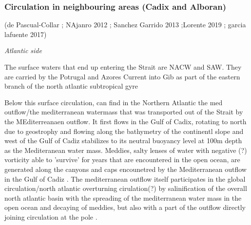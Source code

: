 






\subsubsection{Circulation in neighbouring areas (Cadix and Alboran)}

(de Pascual-Collar ; NAjanro 2012 ; Sanchez Garrido 2013 ;Lorente 2019 ; garcia lafuente 2017)


\textit{Atlantic side}

The surface waters that end up entering the Strait are NACW and SAW\citep{millot_2014,naranjo_2015}. They are carried by the Potrugal and Azores Current into Gib as part of the eastern branch of the north atlantic subtropical gyre \citep{barton_2001}

Below this surface circulation, can find in the Northern Atlantic the med outflow/the mediterranean watermass that was transported out of the Strait by the MEditerreanaen outflow. It first flows in the Gulf of Cadix, rotating to north due to geostrophy and flowing along the bathymetry of the continentl slope\citep{price_1993,gasser_2017} and west of the Gulf of Cadiz stabilizes to its neutral buoyancy level at 100m depth as the Mediteranean water mass\citep{price_1993}. Meddies, salty lenses of water with negative (?) vorticity able to 'survive' for years that are encountered in the open ocean, are generated along the canyons and caps encounetred by the Mediterranean outflow in the Gulf of Cadiz \citep{bashmachnikov_2015}. The mediterranean outflow itself participates in the global circulation/north atlantic overturning cirulation(?) by salinification of the overall north atlantic basin with the spreading of the mediterranean water mass in the open ocean and decaying of meddies, but also with a part of the outflow directly joining circulation at the pole \citep{price_1993,jia_2007}.



